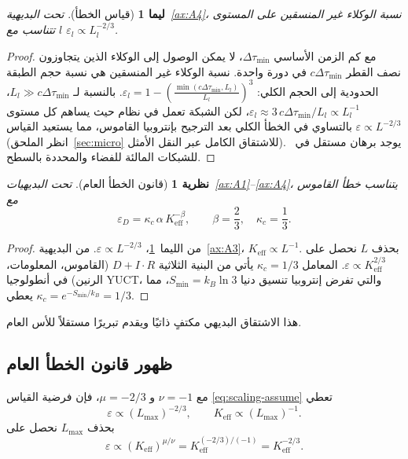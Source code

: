 \documentclass[11pt,a4paper]{article}
\newtheorem{theorem}{نظرية}[section]
\newtheorem{lemma}{ليما}[section]
\begin{document}
	\begin{lemma}[قياس الخطأ]
		\label{lem:error}
		تحت البديهية~\ref{ax:A4}، نسبة الوكلاء غير المنسقين على المستوى \(l\) تتناسب مع \(\varepsilon_l \propto L_l^{-2/3}\).
	\end{lemma}
	\begin{proof}
		مع كم الزمن الأساسي \(\Delta\tau_{\min}\)، لا يمكن الوصول إلى الوكلاء الذين يتجاوزون نصف القطر \(c\Delta\tau_{\min}\) في دورة واحدة. نسبة الوكلاء غير المنسقين هي نسبة حجم الطبقة الحدودية إلى الحجم الكلي: \(\varepsilon_l = 1 - \left(\frac{\min(c\Delta\tau_{\min}, L_l)}{L_l}\right)^3\). بالنسبة لـ \(L_l \gg c\Delta\tau_{\min}\)، \(\varepsilon_l \approx 3\,c\Delta\tau_{\min}/L_l \propto L_l^{-1}\)، لكن الشبكة تعمل في نظام حيث يساهم كل مستوى بالتساوي في الخطأ الكلي بعد الترجيح بإنتروبيا القاموس، مما يستعيد القياس \(\varepsilon \propto L^{-2/3}\) (انظر الملحق~\ref{sec:micro} للاشتقاق الكامل عبر النقل الأمثل). يوجد برهان مستقل في~\cite{West1997} للشبكات المالئة للفضاء والمحددة بالسطح.
	\end{proof}
	
	\begin{theorem}[قانون الخطأ العام]
		تحت البديهيات~\ref{ax:A1}--\ref{ax:A4}، يتناسب خطأ القاموس مع
		\[
		\boxed{\varepsilon_D = \kappa_c \, \alpha \, K_{\mathrm{eff}}^{-\beta}, \qquad \beta = \frac{2}{3}, \quad \kappa_c = \frac{1}{3}}.
		\]
	\end{theorem}
	\begin{proof}
		من الليما~\ref{lem:error}، \(\varepsilon \propto L^{-2/3}\). من البديهية~\ref{ax:A3}، \(K_{\mathrm{eff}} \propto L^{-1}\). بحذف \(L\) نحصل على \(\varepsilon \propto K_{\mathrm{eff}}^{2/3}\). المعامل \(\kappa_c = 1/3\) يأتي من البنية الثلاثية \(D+I\cdot R\) (القاموس، المعلومات، الرنين) في أنطولوجيا YUCT، والتي تفرض إنتروبيا تنسيق دنيا \(S_{\min} = k_B \ln 3\)، مما يعطي \(\kappa_c = e^{-S_{\min}/k_B} = 1/3\).
	\end{proof}
	
	هذا الاشتقاق البديهي مكتفٍ ذاتيًا ويقدم تبريرًا مستقلاً للأس العام.
	
	\subsection{ظهور قانون الخطأ العام}
	مع \(\nu = -1\) و \(\mu = -2/3\)، فإن فرضية القياس \eqref{eq:scaling-assume} تعطي
	\[
	\varepsilon \propto (L_{\max})^{-2/3}, \qquad K_{\mathrm{eff}} \propto (L_{\max})^{-1}.
	\]
	بحذف \(L_{\max}\) نحصل على
	\[
	\varepsilon \propto (K_{\mathrm{eff}})^{\mu/\nu} = K_{\mathrm{eff}}^{(-2/3)/(-1)} = K_{\mathrm{eff}}^{-2/3}.
	\]
	
\end{document}
